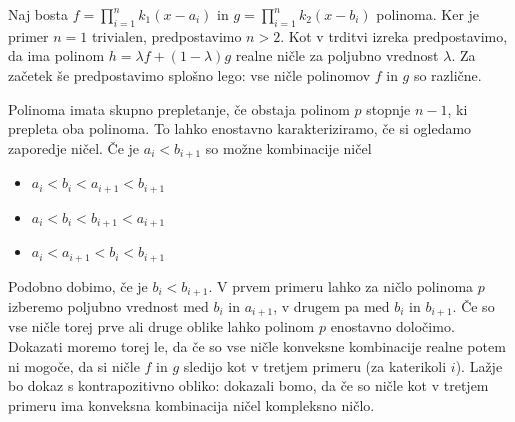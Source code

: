 \begin{dokaz}
    Naj bosta \(f = \prod_{i=1}^n k_1 (x-a_i)\) in \(g = \prod_{i=1}^n k_2 (x-b_i)\) polinoma. Ker je primer \(n=1\) trivialen, predpostavimo \(n>2\). Kot v trditvi izreka predpostavimo, da ima polinom \(h = \lambda f + (1-\lambda) g\) realne ničle za poljubno vrednost \(\lambda\). Za začetek še predpostavimo splošno lego: vse ničle polinomov \(f\) in \(g\) so različne.

    Polinoma imata skupno prepletanje, če obstaja polinom \(p\) stopnje \(n-1\), ki prepleta oba polinoma. To lahko enostavno karakteriziramo, če si ogledamo zaporedje ničel. Če je \(a_i < b_{i+1}\) so možne kombinacije ničel
    \begin{itemize}
        \item \(a_i < b_i < a_{i+1} < b_{i+1}\)
        \item \(a_i < b_i < b_{i+1} < a_{i+1}\)
        \item \(a_i < a_{i+1} < b_i < b_{i+1}\)
    \end{itemize}
    Podobno dobimo, če je \(b_i < b_{i+1}\). V prvem primeru lahko za ničlo polinoma \(p\) izberemo poljubno vrednost med \(b_{i}\) in \(a_{i+1}\), v drugem pa med \(b_i\) in \(b_{i+1}\). Če so vse ničle torej prve ali druge oblike lahko polinom \(p\) enostavno določimo. Dokazati moremo torej le, da če so vse ničle konveksne kombinacije realne potem ni mogoče, da si ničle \(f\) in \(g\) sledijo kot v tretjem primeru (za katerikoli \(i\)). Lažje bo dokaz s kontrapozitivno obliko: dokazali bomo, da če so ničle kot v tretjem primeru ima konveksna kombinacija ničel kompleksno ničlo.


\end{dokaz}
